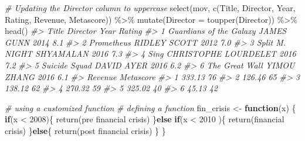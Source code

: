 \documentclass[
]{book}
\newenvironment{Shaded}{\begin{snugshade}}{\end{snugshade}}
\newcommand{\AttributeTok}[1]{\textcolor[rgb]{0.77,0.63,0.00}{#1}}
\newcommand{\CommentTok}[1]{\textcolor[rgb]{0.56,0.35,0.01}{\textit{#1}}}
\newcommand{\ControlFlowTok}[1]{\textcolor[rgb]{0.13,0.29,0.53}{\textbf{#1}}}
\newcommand{\DecValTok}[1]{\textcolor[rgb]{0.00,0.00,0.81}{#1}}
\newcommand{\FunctionTok}[1]{\textcolor[rgb]{0.00,0.00,0.00}{#1}}
\newcommand{\NormalTok}[1]{#1}
\newcommand{\OtherTok}[1]{\textcolor[rgb]{0.56,0.35,0.01}{#1}}
\newcommand{\SpecialCharTok}[1]{\textcolor[rgb]{0.00,0.00,0.00}{#1}}
\newcommand{\StringTok}[1]{\textcolor[rgb]{0.31,0.60,0.02}{#1}}
\begin{document}
\begin{Shaded}
\begin{Highlighting}[]
\CommentTok{\# Updating the Director column to uppercase}
\FunctionTok{select}\NormalTok{(mov, }\FunctionTok{c}\NormalTok{(Title, Director, Year, Rating, Revenue, Metascore)) }\SpecialCharTok{\%\textgreater{}\%}
  \FunctionTok{mutate}\NormalTok{(}\AttributeTok{Director =} \FunctionTok{toupper}\NormalTok{(Director)) }\SpecialCharTok{\%\textgreater{}\%}
  \FunctionTok{head}\NormalTok{()}
\CommentTok{\#\textgreater{}                     Title             Director Year Rating}
\CommentTok{\#\textgreater{} 1 Guardians of the Galaxy           JAMES GUNN 2014    8.1}
\CommentTok{\#\textgreater{} 2              Prometheus         RIDLEY SCOTT 2012    7.0}
\CommentTok{\#\textgreater{} 3                   Split   M. NIGHT SHYAMALAN 2016    7.3}
\CommentTok{\#\textgreater{} 4                    Sing CHRISTOPHE LOURDELET 2016    7.2}
\CommentTok{\#\textgreater{} 5           Suicide Squad           DAVID AYER 2016    6.2}
\CommentTok{\#\textgreater{} 6          The Great Wall          YIMOU ZHANG 2016    6.1}
\CommentTok{\#\textgreater{}   Revenue Metascore}
\CommentTok{\#\textgreater{} 1  333.13        76}
\CommentTok{\#\textgreater{} 2  126.46        65}
\CommentTok{\#\textgreater{} 3  138.12        62}
\CommentTok{\#\textgreater{} 4  270.32        59}
\CommentTok{\#\textgreater{} 5  325.02        40}
\CommentTok{\#\textgreater{} 6   45.13        42}

\CommentTok{\# using a customized function}
\CommentTok{\# defining a function}
\NormalTok{fin\_crisis }\OtherTok{\textless{}{-}} \ControlFlowTok{function}\NormalTok{(x) \{}
    \ControlFlowTok{if}\NormalTok{(x }\SpecialCharTok{\textless{}} \DecValTok{2008}\NormalTok{)\{}
        \FunctionTok{return}\NormalTok{(}\StringTok{\textquotesingle{}pre financial crisis\textquotesingle{}}\NormalTok{)}
\NormalTok{    \}}\ControlFlowTok{else} \ControlFlowTok{if}\NormalTok{(x }\SpecialCharTok{\textless{}} \DecValTok{2010}\NormalTok{ )\{}
        \FunctionTok{return}\NormalTok{(}\StringTok{\textquotesingle{}financial crisis\textquotesingle{}}\NormalTok{)}
\NormalTok{    \}}\ControlFlowTok{else}\NormalTok{\{}
        \FunctionTok{return}\NormalTok{(}\StringTok{\textquotesingle{}post financial crisis\textquotesingle{}}\NormalTok{)}
\NormalTok{    \}}
\NormalTok{\}}


\end{Highlighting}
\end{Shaded}
\end{document}
